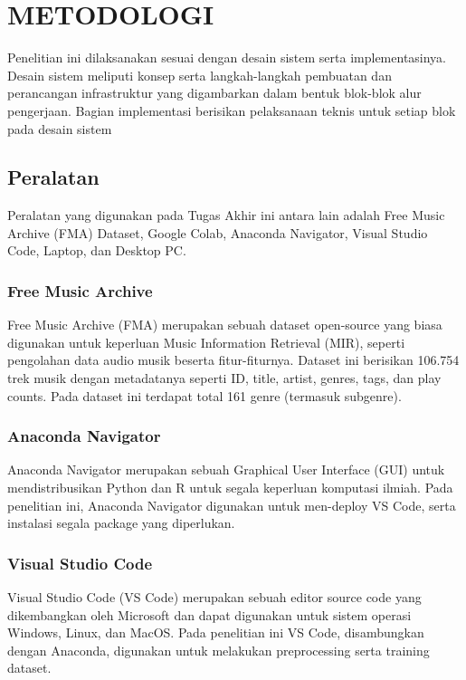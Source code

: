 \chapter{METODOLOGI}
\label{chap:metodologi}


\usetikzlibrary{positioning, fit, calc}   

Penelitian ini dilaksanakan sesuai dengan desain sistem serta implementasinya. Desain sistem meliputi konsep serta langkah-langkah pembuatan dan perancangan infrastruktur yang digambarkan dalam bentuk blok-blok alur pengerjaan. Bagian implementasi berisikan pelaksanaan teknis untuk setiap blok pada desain sistem


\section{Peralatan}
\label{sec:peralatan}

Peralatan yang digunakan pada Tugas Akhir ini antara lain adalah Free Music Archive (FMA) Dataset, Google Colab, Anaconda Navigator, Visual Studio Code, Laptop, dan Desktop PC.

\subsection{Free Music Archive}
\label{subsec:fma}
Free Music Archive (FMA) merupakan sebuah dataset open-source yang biasa digunakan untuk keperluan Music Information Retrieval (MIR), seperti pengolahan data audio musik beserta fitur-fiturnya. Dataset ini berisikan 106.754 trek musik dengan metadatanya seperti ID, title, artist, genres, tags, dan play counts. Pada dataset ini terdapat total 161 genre (termasuk subgenre)\citep{fmadataset}.

\subsection{Anaconda Navigator}
\label{subsec:anacondanav}
Anaconda Navigator merupakan sebuah Graphical User Interface (GUI) untuk mendistribusikan Python dan R untuk segala keperluan komputasi ilmiah. Pada penelitian ini, Anaconda Navigator digunakan untuk men-deploy VS Code, serta instalasi segala package yang diperlukan.

\subsection{Visual Studio Code}
\label{subsec:vscode}
Visual Studio Code (VS Code) merupakan sebuah editor source code yang dikembangkan oleh Microsoft dan dapat digunakan untuk sistem operasi Windows, Linux, dan MacOS. Pada penelitian ini VS Code, disambungkan dengan Anaconda, digunakan untuk melakukan preprocessing serta training dataset.

